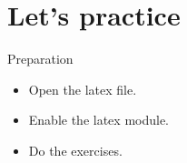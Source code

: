 \documentclass[presentation]{beamer}
\begin{document}
\section{Let's practice}
\label{sec:orgb346b31}

\begin{frame}[label={sec:org36094d2}]{Preparation}
\begin{itemize}
\item Open the latex file.
\item Enable the latex module.
\item Do the exercises.
\end{itemize}
\end{frame}
\end{document}
